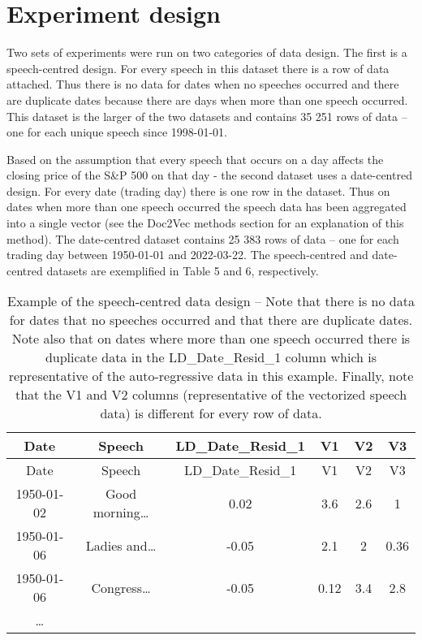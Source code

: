 \documentclass[11pt,preprint, authoryear]{elsarticle}
\numberwithin{equation}{section}
\numberwithin{figure}{section}
\numberwithin{table}{section}
\begin{document}
\hypertarget{experiment-design}{%
\section{Experiment design}\label{experiment-design}}

Two sets of experiments were run on two categories of data design. The
first is a speech-centred design. For every speech in this dataset there
is a row of data attached. Thus there is no data for dates when no
speeches occurred and there are duplicate dates because there are days
when more than one speech occurred. This dataset is the larger of the
two datasets and contains 35 251 rows of data -- one for each unique
speech since 1998-01-01.

Based on the assumption that every speech that occurs on a day affects
the closing price of the S\&P 500 on that day - the second dataset uses
a date-centred design. For every date (trading day) there is one row in
the dataset. Thus on dates when more than one speech occurred the speech
data has been aggregated into a single vector (see the Doc2Vec methods
section for an explanation of this method). The date-centred dataset
contains 25 383 rows of data -- one for each trading day between
1950-01-01 and 2022-03-22. The speech-centred and date-centred datasets
are exemplified in Table 5 and 6, respectively.

\begin{longtable}[]{@{}cccccc@{}}
\caption{Example of the speech-centred data design -- Note that there is
no data for dates that no speeches occurred and that there are duplicate
dates. Note also that on dates where more than one speech occurred there
is duplicate data in the LD\_Date\_Resid\_1 column which is
representative of the auto-regressive data in this example. Finally,
note that the V1 and V2 columns (representative of the vectorized speech
data) is different for every row of data.}\tabularnewline
\toprule
Date & Speech & LD\_Date\_Resid\_1 & V1 & V2 & V3 \\
\midrule
\endfirsthead
\toprule
Date & Speech & LD\_Date\_Resid\_1 & V1 & V2 & V3 \\
\midrule
\endhead
1950-01-02 & Good morning\ldots{} & 0.02 & 3.6 & 2.6 & 1 \\
1950-01-06 & Ladies and\ldots{} & -0.05 & 2.1 & 2 & 0.36 \\
1950-01-06 & Congress\ldots{} & -0.05 & 0.12 & 3.4 & 2.8 \\
\ldots{} & & & & & \\
\bottomrule
\end{longtable}
\end{document}
